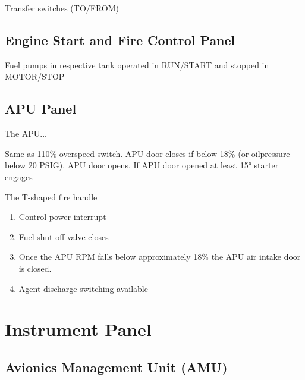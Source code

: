 Transfer switches (TO/FROM)

\subsection{Engine Start and Fire Control Panel}
\label{sec:eng-panel}

\begin{enumerate}
    \begin{itemize}
    \end{itemize}
    Fuel pumps in respective tank operated in RUN/START and stopped in MOTOR/STOP
\end{enumerate}

\subsection{APU Panel}
\label{sec:apu-panel}

The \gls{APU}...

\begin{enumerate}
    \begin{itemize}
       Same as 110\% overspeed switch. APU door closes if below 18\% (or oilpressure below 20 PSIG).
       APU door opens.
       If APU door opened at least 15° starter engages
    \end{itemize}
   The T-shaped fire handle
    \begin{enumerate}
      \item Control power interrupt
      \item Fuel shut-off valve closes
      \item Once the APU \gls{RPM} falls below approximately 18\% the APU air intake door is closed.
      \item Agent discharge switching available
    \end{enumerate}
\end{enumerate}

\section{Instrument Panel}

\subsection{Avionics Management Unit (AMU)}
\label{sec:amu}

